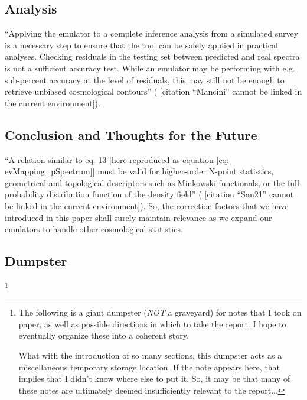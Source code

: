 \documentclass[11pt]{article}
\newcommand{\cbib}[1]
{\IfFileExists{biblatex.sty}
{\cite{#1}}
{[citation ``#1'' cannot be linked in the current environment]}}
\begin{document}
\begin{centering}
\section{Analysis}
\end{centering}

``Applying the emulator to a complete inference analysis from a simulated
survey is a necessary step to ensure that the tool can be safely applied in
practical analyses. Checking residuals in the testing set between predicted and
real spectra is not a sufficient accuracy test. While an emulator may be
performing with e.g. sub-percent accuracy at the level of residuals, this may
still not be enough to retrieve unbiased cosmological contours''
(\cbib{Mancini}).

\begin{centering}
\section{Conclusion and Thoughts for the Future}
\end{centering}

``A relation similar to eq. 13 [here reproduced as equation
\ref{eq: evMapping_pSpectrum}] must be valid
for higher-order N-point statistics, geometrical and topological descriptors
such as Minkowski functionals, or the full probability distribution function of
the density field'' (\cbib{San21}). So, the correction factors that we have
introduced in this paper shall surely maintain relevance as we expand our
emulators to handle other cosmological statistics.

\begin{centering}
\section{Dumpster}
\end{centering}

\footnote{
    The following is a giant dumpster (\textit{NOT} a graveyard) for notes
    that I took on paper, as well as possible directions in which to take the
    report. I hope to eventually organize these into a coherent story.

    What with the introduction of so many
    sections, this dumpster acts as a miscellaneous
    temporary storage location. If the note appears here, that implies that I
    didn't know where else to put it. So, it may be that many of these notes
    are ultimately deemed insufficiently relevant to the report...
}
\end{document}
